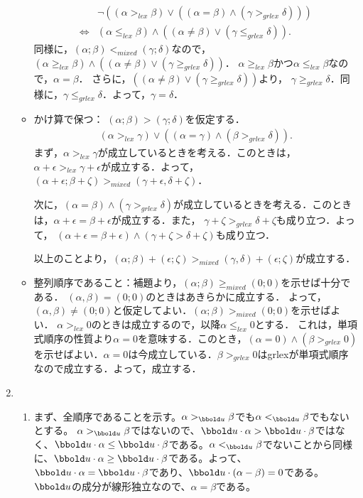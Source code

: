 \begin{enumerate}[label=(問題\arabic*)]
\begin{itemize}
\begin{align}
& \neg ((\alpha >_{lex} \beta) \lor ((\alpha = \beta) \land (\gamma >_{grlex} \delta)))\\
 \iff&
(\alpha \le_{lex} \beta) \land ((\alpha \neq \beta) \lor (\gamma \le_{grlex}\delta)).
\end{align}
同様に，$(\alpha;\beta)<_{mixed}(\gamma;\delta)$なので，$(\alpha \ge_{lex}\beta)\land ((\alpha\neq \beta)\lor (\gamma \ge_{grlex} \delta))$．
$\alpha \ge_{lex} \beta$かつ$\alpha \le_{lex}\beta$なので，$\alpha = \beta$．
さらに，$((\alpha\neq \beta)\lor (\gamma \ge_{grlex}\delta))$より，
$\gamma \ge_{grlex}\delta$．同様に，$\gamma \le_{grlex}\delta$．よって，$\gamma=\delta$．
 \item かけ算で保つ：
$(\alpha;\beta)>(\gamma;\delta)$を仮定する．
\begin{align}
 (\alpha >_{lex} \gamma) \lor ((\alpha = \gamma )\land (\beta >_{grlex} \delta)).
\end{align}
まず，$\alpha >_{lex}\gamma$が成立しているときを考える．このときは，
$\alpha + \epsilon >_{lex} \gamma + \epsilon$が成立する．よって，
$(\alpha+\epsilon ; \beta + \zeta) >_{mixed} (\gamma+\epsilon, \delta+\zeta)$．

次に，$(\alpha = \beta) \land (\gamma >_{grlex} \delta)$が成立しているときを考える．このときは，$\alpha + \epsilon = \beta + \epsilon$が成立する．また，
$\gamma + \zeta >_{grlex} \delta+\zeta$も成り立つ．よって，
$(\alpha + \epsilon = \beta + \epsilon) \land(\gamma + \zeta > \delta + \zeta)$も成り立つ．

以上のことより，$(\alpha;\beta) + (\epsilon;\zeta) >_{mixed} (\gamma,\delta) + (\epsilon;\zeta)$が成立する．
 \item 整列順序であること：補題より，$(\alpha;\beta) \ge_{mixed} (0;0)$を示せば十分である．
$(\alpha,\beta)=(0;0)$のときはあきらかに成立する．
よって，$(\alpha,\beta)\neq (0;0)$と仮定してよい．$(\alpha;\beta) >_{mixed} (0;0)$を示せばよい．
$\alpha >_{lex} 0$のときは成立するので，以降$\alpha \le_{lex} 0$とする．
これは，単項式順序の性質より$\alpha = 0$を意味する．このとき，$(\alpha = 0) \land (\beta >_{grlex} 0) $を示せばよい．$\alpha = 0$は今成立している．$\beta >_{grlex} 0$はgrlexが単項式順序なので成立する．よって，成立する．
\end{itemize}
 \item
 \begin{enumerate}[label=(\alph*)]
   \item まず、全順序であることを示す。$\alpha >_{\bbold u} \beta$でも$\alpha <_{\bbold u} \beta$でもないとする。
   $\alpha >_{\bbold u} \beta$ではないので、$\bbold u\cdot \alpha > \bbold u \cdot \beta$ではなく、$\bbold u\cdot \alpha \le \bbold u\cdot \beta$である。$\alpha <_{\bbold u}\beta$でないことから同様に、$\bbold u\cdot \alpha \ge \bbold u\cdot \beta$である。よって、
   $\bbold u\cdot \alpha = \bbold u\cdot \beta$であり、$\bbold u\cdot (\alpha -\beta) = 0$である。$\bbold u$の成分が線形独立なので、$\alpha  = \beta$である。


\end{enumerate}
\end{enumerate}
